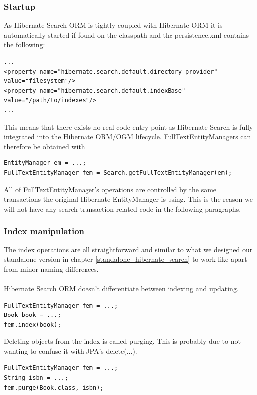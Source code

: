 \pagebreak

\subsubsection{Startup} \label{startup_original}
As Hibernate Search ORM is tightly coupled with Hibernate ORM it is automatically started if found on the classpath and the persistence.xml contains the following:
\\
\lstset{language=java, breaklines=true}
\begin{lstlisting}[frame=htrbl, caption={Additions to persistence.xml with Hibernate Search ORM}, label={lst:hibernate_search_persistence.xml}]
...
<property name="hibernate.search.default.directory_provider" value="filesystem"/>
<property name="hibernate.search.default.indexBase" value="/path/to/indexes"/>
...
\end{lstlisting}
\noindent
This means that there exists no real code entry point as Hibernate Search is fully integrated into the Hibernate ORM/OGM lifecycle. FullTextEntityManagers can therefore be obtained with:
\\
\lstset{language=java}
\begin{lstlisting}[frame=htrbl, caption={Obtaining a FullTextEntityManager with Hibernate Search ORM}, label={lst:indexing_object_hsearch_orm_jpa.java}]
EntityManager em = ...;
FullTextEntityManager fem = Search.getFullTextEntityManager(em);
\end{lstlisting}
All of FullTextEntityManager's operations are controlled by the same transactions the original Hibernate EntityManager is using. This is the reason we will not have any search transaction related code in the following paragraphs.

\pagebreak

\subsubsection{Index manipulation}
The index operations are all straightforward and similar to what we designed our standalone version in chapter \ref{standalone_hibernate_search} to work like apart from minor naming differences. 
\\\\
Hibernate Search ORM doesn't differentiate between indexing and updating.
\\
\lstset{language=java}
\begin{lstlisting}[frame=htrbl, caption={Indexing/Updating an object with Hibernate Search ORM}, label={lst:indexing_object_hsearch_orm_jpa.java}]
FullTextEntityManager fem = ...;
Book book = ...;
fem.index(book);
\end{lstlisting}
\noindent
Deleting objects from the index is called purging. This is probably due to not wanting to confuse it with JPA's delete(...).
\\
\lstset{language=java}
\begin{lstlisting}[frame=htrbl, caption={Deleting an object by id with Hibernate Search ORM}, label={lst:deleting_object_hsearch_orm_jpa.java}]
FullTextEntityManager fem = ...;
String isbn = ...;
fem.purge(Book.class, isbn);
\end{lstlisting}

